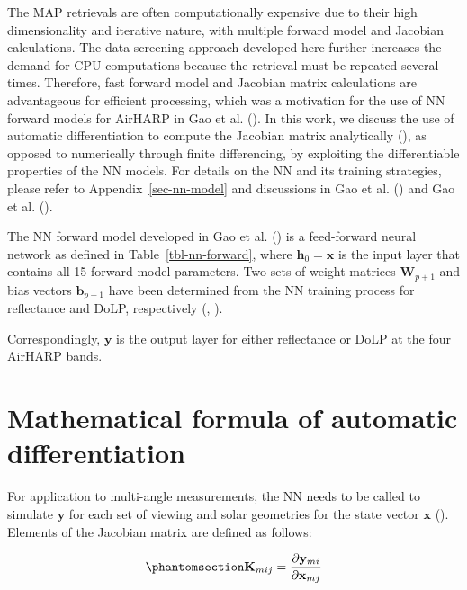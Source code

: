 \documentclass[
  11pt,
  letterpaper,
]{scrreprt}
\begin{document}
The MAP retrievals are often computationally expensive due to their high
dimensionality and iterative nature, with multiple forward model and
Jacobian calculations. The data screening approach developed here
further increases the demand for CPU computations because the retrieval
must be repeated several times. Therefore, fast forward model and
Jacobian matrix calculations are advantageous for efficient processing,
which was a motivation for the use of NN forward models for AirHARP in
Gao et al. (). In this work, we discuss
the use of automatic differentiation to compute the Jacobian matrix
analytically (), as opposed to
numerically through finite differencing, by exploiting the
differentiable properties of the NN models. For details on the NN and
its training strategies, please refer to Appendix~\ref{sec-nn-model} and
discussions in Gao et al. () and Gao et
al. ().

The NN forward model developed in Gao et al.
() is a feed-forward neural network as
defined in Table~\ref{tbl-nn-forward}, where \(\mathbf{h}_0=\mathbf{x}\)
is the input layer that contains all 15 forward model parameters. Two
sets of weight matrices \(\mathbf{W}_{p+1}\) and bias vectors
\(\mathbf{b}_{p+1}\) have been determined from the NN training process
for reflectance and DoLP, respectively (, ).

Correspondingly, \(\mathbf{y}\) is the output layer for either
reflectance or DoLP at the four AirHARP bands.

\section{Mathematical formula of automatic
differentiation}\label{mathematical-formula-of-automatic-differentiation}

For application to multi-angle measurements, the NN needs to be called
to simulate \(\mathbf{y}\) for each set of viewing and solar geometries
for the state vector \(\mathbf{x}\) (). Elements of the Jacobian matrix are defined as follows:

\begin{equation}\phantomsection\label{eq-jacobian}{
\mathbf{K}_{mij}
=
\frac{\partial \mathbf{y}_{mi}}
{\partial \mathbf{x}_{mj}}
}\end{equation}
\end{document}
